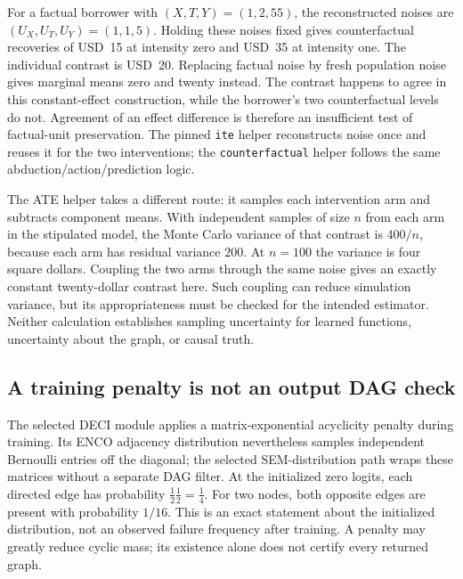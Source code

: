 For a factual borrower with \((X,T,Y)=(1,2,55)\), the reconstructed noises are
\((U_X,U_T,U_Y)=(1,1,5)\). Holding these noises fixed gives counterfactual
recoveries of USD~15 at intensity zero and USD~35 at intensity one. The
individual contrast is USD~20. Replacing factual noise by fresh population
noise gives marginal means zero and twenty instead. The contrast happens
to agree in this constant-effect construction, while the borrower's two
counterfactual levels do not. Agreement of an effect difference is therefore
an insufficient test of factual-unit preservation. The pinned \texttt{ite}
helper reconstructs noise once and reuses it for the two interventions;
the \texttt{counterfactual} helper follows the same abduction/action/prediction
logic. \citep{exec14_causica_primary,exec14_causica_exact}

The ATE helper takes a different route: it samples each intervention arm and
subtracts component means. With independent samples of size \(n\) from each
arm in the stipulated model, the Monte Carlo variance of that contrast is
\(400/n\), because each arm has residual variance \(200\). At \(n=100\)
the variance is four square dollars. Coupling the two arms through the same
noise gives an exactly constant twenty-dollar contrast here. Such coupling
can reduce simulation variance, but its appropriateness must be checked for
the intended estimator. Neither calculation establishes sampling uncertainty
for learned functions, uncertainty about the graph, or causal truth.
\citep{exec14_causica_exact}

\subsection{A training penalty is not an output DAG check}

The selected DECI module applies a matrix-exponential acyclicity penalty during
training. Its ENCO adjacency distribution nevertheless samples independent
Bernoulli entries off the diagonal; the selected SEM-distribution path wraps
these matrices without a separate DAG filter. At the initialized zero logits,
each directed edge has probability \(\tfrac12\tfrac12=\tfrac14\).
For two nodes, both opposite edges are present with probability
\(1/16\). This is an exact statement about the initialized distribution,
not an observed failure frequency after training. A penalty may greatly
reduce cyclic mass; its existence alone does not certify every returned
graph. \citep{exec14_causica_primary,exec14_causica_exact}

